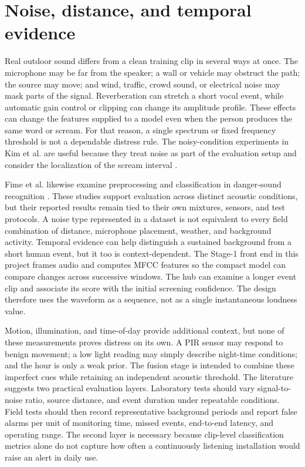 \documentclass[12pt,a4paper]{report}
\begin{document}
\section{Noise, distance, and temporal evidence}

Real outdoor sound differs from a clean training clip in several ways at once. The microphone may be far from the speaker; a wall or vehicle may obstruct the path; the source may move; and wind, traffic, crowd sound, or electrical noise may mask parts of the signal. Reverberation can stretch a short vocal event, while automatic gain control or clipping can change its amplitude profile. These effects can change the features supplied to a model even when the person produces the same word or scream. For that reason, a single spectrum or fixed frequency threshold is not a dependable distress rule. The noisy-condition experiments in Kim et al. are useful because they treat noise as part of the evaluation setup and consider the localization of the scream interval \cite{kimwindow}.

Fime et al. likewise examine preprocessing and classification in danger-sound recognition \cite{fime}. These studies support evaluation across distinct acoustic conditions, but their reported results remain tied to their own mixtures, sensors, and test protocols. A noise type represented in a dataset is not equivalent to every field combination of distance, microphone placement, weather, and background activity. Temporal evidence can help distinguish a sustained background from a short human event, but it too is context-dependent. The Stage-1 front end in this project frames audio and computes MFCC features so the compact model can compare changes across successive windows. The hub can examine a longer event clip and associate its score with the initial screening confidence. The design therefore uses the waveform as a sequence, not as a single instantaneous loudness value.

Motion, illumination, and time-of-day provide additional context, but none of these measurements proves distress on its own. A PIR sensor may respond to benign movement; a low light reading may simply describe night-time conditions; and the hour is only a weak prior. The fusion stage is intended to combine these imperfect cues while retaining an independent acoustic threshold. The literature suggests two practical evaluation layers. Laboratory tests should vary signal-to-noise ratio, source distance, and event duration under repeatable conditions. Field tests should then record representative background periods and report false alarms per unit of monitoring time, missed events, end-to-end latency, and operating range. The second layer is necessary because clip-level classification metrics alone do not capture how often a continuously listening installation would raise an alert in daily use.
\end{document}
